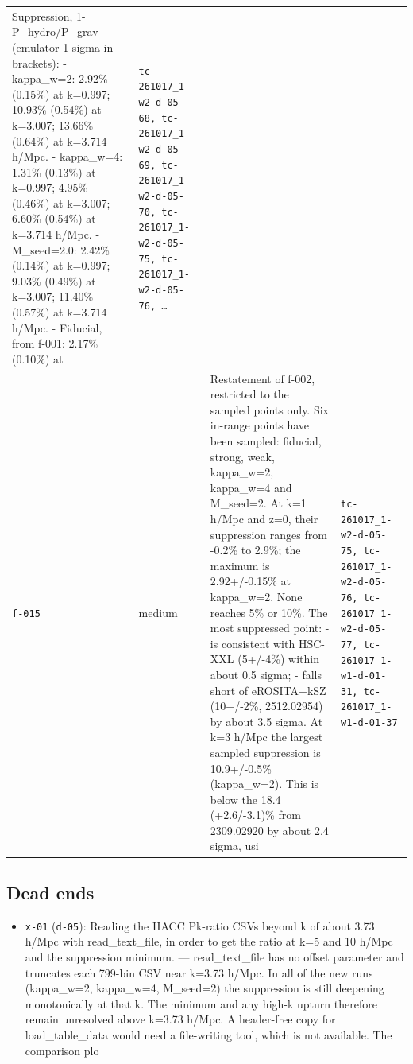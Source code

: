 \documentclass[11pt,a4paper]{article}
\begin{document}
\begin{longtable}{@{}p{}p{}p{}p{}@{}}
Suppression, 1-P\_hydro/P\_grav (emulator 1-sigma in brackets):
- kappa\_w=2: 2.92\% (0.15\%) at k=0.997; 10.93\% (0.54\%) at k=3.007; 13.66\% (0.64\%) at k=3.714 h/Mpc.
- kappa\_w=4: 1.31\% (0.13\%) at k=0.997; 4.95\% (0.46\%) at k=3.007; 6.60\% (0.54\%) at k=3.714 h/Mpc.
- M\_seed=2.0: 2.42\% (0.14\%) at k=0.997; 9.03\% (0.49\%) at k=3.007; 11.40\% (0.57\%) at k=3.714 h/Mpc.
- Fiducial, from f-001: 2.17\% (0.10\%) at & \texttt{tc-261017\_\allowbreak{}1-w2-d-05-68,\allowbreak{} tc-261017\_\allowbreak{}1-w2-d-05-69,\allowbreak{} tc-261017\_\allowbreak{}1-w2-d-05-70,\allowbreak{} tc-261017\_\allowbreak{}1-w2-d-05-75,\allowbreak{} tc-261017\_\allowbreak{}1-w2-d-05-76,\allowbreak{} \ldots{}\allowbreak{}} \\
\texttt{f-015} & medium & Restatement of f-002, restricted to the sampled points only. Six in-range points have been sampled: fiducial, strong, weak, kappa\_w=2, kappa\_w=4 and M\_seed=2.
At k=1 h/Mpc and z=0, their suppression ranges from -0.2\% to 2.9\%; the maximum is 2.92+/-0.15\% at kappa\_w=2. None reaches 5\% or 10\%. The most suppressed point:
- is consistent with HSC-XXL (5+/-4\%) within about 0.5 sigma;
- falls short of eROSITA+kSZ (10+/-2\%, 2512.02954) by about 3.5 sigma.
At k=3 h/Mpc the largest sampled suppression is 10.9+/-0.5\% (kappa\_w=2). This is below the 18.4 (+2.6/-3.1)\% from 2309.02920 by about 2.4 sigma, usi & \texttt{tc-261017\_\allowbreak{}1-w2-d-05-75,\allowbreak{} tc-261017\_\allowbreak{}1-w2-d-05-76,\allowbreak{} tc-261017\_\allowbreak{}1-w2-d-05-77,\allowbreak{} tc-261017\_\allowbreak{}1-w1-d-01-31,\allowbreak{} tc-261017\_\allowbreak{}1-w1-d-01-37} \\
\bottomrule\end{longtable}
\subsection{Dead ends}
\begin{itemize}
  \item \texttt{x-01} (\texttt{d-05}): Reading the HACC Pk-ratio CSVs beyond k of about 3.73 h/Mpc with read\_text\_file, in order to get the ratio at k=5 and 10 h/Mpc and the suppression minimum. --- read\_text\_file has no offset parameter and truncates each 799-bin CSV near k=3.73 h/Mpc. In all of the new runs (kappa\_w=2, kappa\_w=4, M\_seed=2) the suppression is still deepening monotonically at that k. The minimum and any high-k upturn therefore remain unresolved above k=3.73 h/Mpc. A header-free copy for load\_table\_data would need a file-writing tool, which is not available. The comparison plo
\end{itemize}
\end{document}
